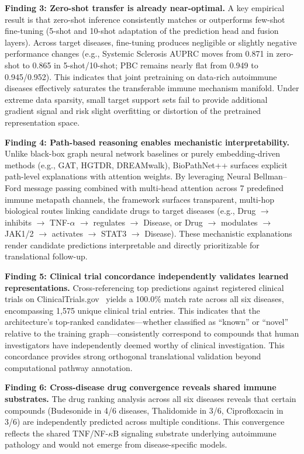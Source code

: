 \documentclass[conference]{IEEEtran}
\begin{document}
\textbf{Finding 3: Zero-shot transfer is already near-optimal.} A key empirical result is that zero-shot inference consistently matches or outperforms few-shot fine-tuning (5-shot and 10-shot adaptation of the prediction head and fusion layers). Across target diseases, fine-tuning produces negligible or slightly negative performance changes (e.g., Systemic Sclerosis AUPRC moves from 0.871 in zero-shot to 0.865 in 5-shot/10-shot; PBC remains nearly flat from 0.949 to 0.945/0.952). This indicates that joint pretraining on data-rich autoimmune diseases effectively saturates the transferable immune mechanism manifold. Under extreme data sparsity, small target support sets fail to provide additional gradient signal and risk slight overfitting or distortion of the pretrained representation space.

\textbf{Finding 4: Path-based reasoning enables mechanistic interpretability.} Unlike black-box graph neural network baselines or purely embedding-driven methods (e.g., GAT, HGTDR, DREAMwalk), BioPathNet++ surfaces explicit path-level explanations with attention weights. By leveraging Neural Bellman--Ford message passing combined with multi-head attention across 7 predefined immune metapath channels, the framework surfaces transparent, multi-hop biological routes linking candidate drugs to target diseases (e.g., Drug $\rightarrow$ inhibits $\rightarrow$ TNF-$\alpha$ $\rightarrow$ regulates $\rightarrow$ Disease, or Drug $\rightarrow$ modulates $\rightarrow$ JAK1/2 $\rightarrow$ activates $\rightarrow$ STAT3 $\rightarrow$ Disease). These mechanistic explanations render candidate predictions interpretable and directly prioritizable for translational follow-up.

\textbf{Finding 5: Clinical trial concordance independently validates learned representations.} Cross-referencing top predictions against registered clinical trials on ClinicalTrials.gov~\cite{clinicaltrials} yields a 100.0\% match rate across all six diseases, encompassing 1,575 unique clinical trial entries. This indicates that the architecture's top-ranked candidates---whether classified as ``known'' or ``novel'' relative to the training graph---consistently correspond to compounds that human investigators have independently deemed worthy of clinical investigation. This concordance provides strong orthogonal translational validation beyond computational pathway annotation.

\textbf{Finding 6: Cross-disease drug convergence reveals shared immune substrates.} The drug ranking analysis across all six diseases reveals that certain compounds (Budesonide in 4/6 diseases, Thalidomide in 3/6, Ciprofloxacin in 3/6) are independently predicted across multiple conditions. This convergence reflects the shared TNF/NF-$\kappa$B signaling substrate underlying autoimmune pathology and would not emerge from disease-specific models.
\end{document}
